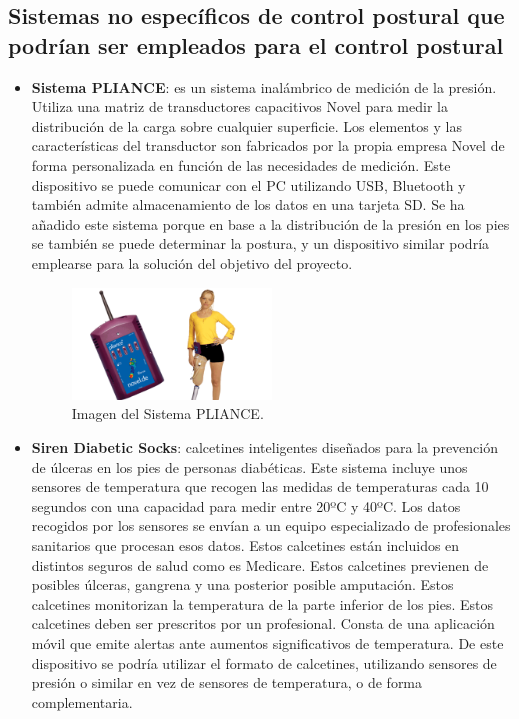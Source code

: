 \subsection{Sistemas no específicos de control postural que podrían ser empleados para el control postural} 
\begin{itemize}
    \item \textbf{Sistema PLIANCE}\cite{Pliance1,Pliance2}: es un sistema inalámbrico de medición de la presión. Utiliza una matriz de transductores capacitivos Novel para medir la distribución de la carga sobre cualquier superficie. Los elementos y las características del transductor son fabricados por la propia empresa Novel\cite{Novel} de forma personalizada en función de las necesidades de medición. Este dispositivo se puede comunicar con el PC utilizando USB, Bluetooth y también admite almacenamiento de los datos en una tarjeta SD. Se ha añadido este sistema porque en base a la distribución de la presión en los pies se también se puede determinar la postura, y un dispositivo similar podría emplearse para la solución del objetivo del proyecto. 
\begin{figure}[h!]
    \centering
    \includegraphics[width=0.5\textwidth]{img/imgPliance.png}
    \caption{Imagen del Sistema PLIANCE. \cite{Pliance1}}
    \label{fig:imgPliance} 
\end{figure}

    \item \textbf{Siren Diabetic Socks}\cite{SirenSocks1,SirenSocks2}: calcetines inteligentes diseñados para la prevención de úlceras en los pies de personas diabéticas. Este sistema incluye unos sensores de temperatura que recogen las medidas de temperaturas cada 10 segundos con una capacidad para medir entre 20ºC y 40ºC. Los datos recogidos por los sensores se envían a un equipo especializado de profesionales sanitarios que procesan esos datos. Estos calcetines están incluidos en distintos seguros de salud como es Medicare\cite{Medicare}. Estos calcetines previenen de posibles úlceras, gangrena y una posterior posible amputación. Estos calcetines monitorizan la temperatura de la parte inferior de los pies. Estos calcetines deben ser prescritos por un profesional. Consta de una aplicación móvil que emite alertas ante aumentos significativos de temperatura. De este dispositivo se podría utilizar el formato de calcetines, utilizando sensores de presión o similar en vez de sensores de temperatura, o de forma complementaria.


\end{itemize}

